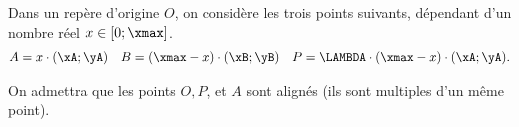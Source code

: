 

\pagestyle{fancy}
\fancyhead[R]{\today}

Dans un repère d'origine $O$, on considère les trois points suivants, dépendant d'un nombre réel $x \in [0;\xmax]$.
	\begin{align*}
		A  = x \cdot (\xA;\yA) && B = (\xmax-x)\cdot(\xB ; \yB) && P = \LAMBDA \cdot (\xmax-x)\cdot (\xA;\yA).
	\end{align*}

On admettra que les points $O, P$, et $A$ sont alignés (ils sont multiples d'un même point).
	
	
	
%
%	
	

